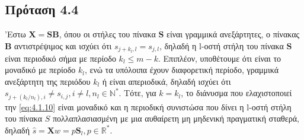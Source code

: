 \subsection*{\small{Πρόταση 4.4}}
'Εστω $\mathbf{X} = \mathbf{S} \mathbf{B}$, όπου οι στήλες του πίνακα $\mathbf{S}$ είναι γραμμικά ανεξάρτητες, ο πίνακας $\mathbf{B}$ αντιστρέψιμος και ισχύει ότι $s_{j+k_l,l} = s_{j,l}$, δηλαδή η l-οστή στήλη του πίνακα $\mathbf{S}$ είναι περιοδικό σήμα με περίοδο $k_l \leq m-k$. Επιπλέον, υποθέτουμε ότι είναι το μοναδικό με περίοδο $k_l$, ενώ τα υπόλοιπα έχουν διαφορετική περίοδο, γραμμικά ανεξάρτητη της περιόδου $k_l$ ή είναι απεριοδικά, δηλαδή ισχύει ότι $s_{j+(k_l/n_l),i} \neq s_{i,j}, i \neq l, n_l \in \mathbb{N}^* $. Τότε, για $k = k_l$, το διάνυσμα που ελαχιστοποιεί την \eqref{eq:4.1.10} είναι μοναδικό και η περιοδική συνιστώσα που δίνει η l-οστή στήλη του πίνακα $S$ πολλαπλασιασμένη με μια αυθαίρετη μη μηδενική πραγματική σταθερά, δηλαδή $\hat{s} = \mathbf{X} w = p \mathbf{S}_l, p \in \mathbb{R}^*$.
